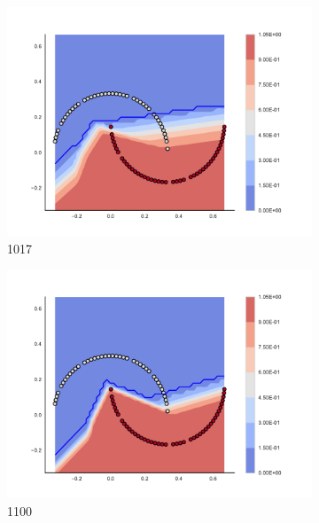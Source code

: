 \begin{figure}[h]
\begin{subfigure}[b]{0.09\textwidth}
    \includegraphics[clip, trim=2.35cm 1.75cm 4.5cm 0cm,width=\textwidth]{img/convergence/1017.pdf}
    \caption{1017}
    \label{fig:convergence_1017}
\end{subfigure}
%
\begin{subfigure}[b]{0.09\textwidth}
    \includegraphics[clip, trim=2.35cm 1.75cm 4.5cm 0cm,width=\textwidth]{img/convergence/1100.pdf}
    \caption{1100}
    \label{fig:convergence_1100}
\end{subfigure}
%
\begin{subfigure}[b]{0.09\textwidth}

\end{subfigure}
\end{figure}
